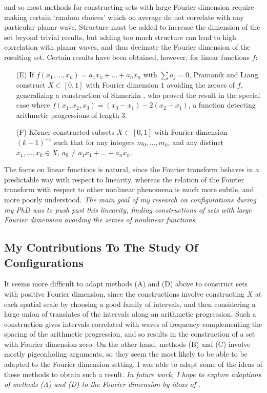 \documentclass[11pt]{article}
\begin{document}
 and so most methods for constructing sets with large Fourier dimension require making certain `random choices' which on average do not correlate with any particular planar wave. Structure must be added to increase the dimension of the set beyond trivial results, but adding too much structure can lead to high correlation with planar waves, and thus decimate the Fourier dimension of the resulting set. Certain results have been obtained, however, for linear functions $f$:
%
\begin{itemize}
	\item[(E)] If $f(x_1,\dots,x_n) = a_1x_1 + \dots + a_nx_n$ with $\sum a_j = 0$, Pramanik and Liang \cite{PramanikLiang} construct $X \subset [0,1]$ with Fourier dimension $1$ avoiding the zeroes of $f$, generalizing a construction of Shmerkin \cite{Shmerkin}, who proved the result in the special case where $f(x_1,x_2,x_3) = (x_3 - x_1) - 2 (x_2 - x_1)$, a function detecting arithmetic progressions of length 3.

	\item[(F)] K\"{o}rner constructed subsets $X \subset [0,1]$ with Fourier dimension $(k-1)^{-1}$ such that for any integers $m_0,\dots,m_k$, and any distinct $x_1,\dots,x_k \in X$, $a_0 \neq a_1x_1 + \dots + a_nx_n$.
\end{itemize}
%
The focus on linear functions is natural, since the Fourier transform behaves in a predictable way with respect to linearity, whereas the relation of the Fourier transform with respect to other nonlinear phenomena is much more subtle, and more poorly understood. \emph{The main goal of my research on configurations during my PhD was to push past this linearity, finding constructions of sets with large Fourier dimension avoiding the zeroes of nonlinear functions}.

\subsection{My Contributions To The Study Of Configurations} \label{MyContributionFractals}

It seems more difficult to adapt methods (A) and (D) above to construct sets with positive Fourier dimension, since the constructions involve constructing $X$ at each spatial scale by choosing a good family of intervals, and then considering a large union of translates of the intervals along an arithmetic progression. Such a construction gives intervals correlated with waves of frequency complementing the spacing of the arithmetic progression, and so results in the construction of a set with Fourier dimension zero. On the other hand, methods (B) and (C) involve mostly pigeonholing arguments, so they seem the most likely to be able to be adapted to the Fourier dimension setting. I was able to adapt some of the ideas of these methods to obtain such a result. \emph{In future work, I hope to explore adaptions of methods (A) and (D) to the Fourier dimension by ideas of \cite{Shmerkin}}.
\end{document}
